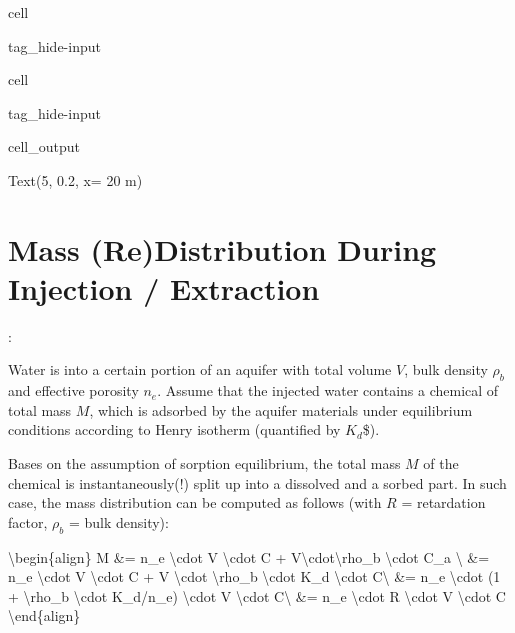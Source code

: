 \documentclass[letterpaper,10pt,english]{jupyterBook}
\begin{document}
\begin{sphinxuseclass}{cell}
\begin{sphinxuseclass}{tag_hide-input}
\end{sphinxuseclass}
\end{sphinxuseclass}
\begin{sphinxuseclass}{cell}
\begin{sphinxuseclass}{tag_hide-input}\begin{sphinxVerbatimOutput}

\begin{sphinxuseclass}{cell_output}
\begin{sphinxVerbatim}[commandchars=\\\{\}]
Text(5, 0.2, \PYGZsq{}\PYGZdl{}x= 20\PYGZdl{} m\PYGZsq{})
\end{sphinxVerbatim}

\noindent{}

\end{sphinxuseclass}\end{sphinxVerbatimOutput}

\end{sphinxuseclass}
\end{sphinxuseclass}

\section{Mass (Re\sphinxhyphen{})Distribution During Injection / Extraction}
\label{\detokenize{content/transport/L10/22_reactive_transport:mass-re-distribution-during-injection-extraction}}
\sphinxAtStartPar
{}:

\sphinxAtStartPar
Water is  into a certain portion of an aquifer with total volume \(V\), bulk density \(\rho_b\) and effective porosity \(n_e\). Assume that the injected water contains a chemical of total mass \(M\), which is adsorbed by the aquifer materials under equilibrium conditions according to Henry isotherm (quantified by \(K_d\)\$).

\sphinxAtStartPar
Bases on the assumption of sorption equilibrium, the total mass \(M\) of the chemical is instantaneously(!) split up into a dissolved and a sorbed part. In such case, the mass distribution can be computed as follows (with \(R\) = retardation factor, \(\rho_b\)
= bulk density):

\sphinxAtStartPar
\textbackslash{}begin\{align\}
M \&= n\_e \textbackslash{}cdot V \textbackslash{}cdot C + V\textbackslash{}cdot\textbackslash{}rho\_b \textbackslash{}cdot C\_a \textbackslash{}
\&= n\_e \textbackslash{}cdot V \textbackslash{}cdot C + V \textbackslash{}cdot \textbackslash{}rho\_b \textbackslash{}cdot K\_d \textbackslash{}cdot C\textbackslash{}
\&= n\_e \textbackslash{}cdot (1 + \textbackslash{}rho\_b \textbackslash{}cdot K\_d/n\_e) \textbackslash{}cdot V \textbackslash{}cdot C\textbackslash{}
\&= n\_e \textbackslash{}cdot R \textbackslash{}cdot V \textbackslash{}cdot C
\textbackslash{}end\{align\}
\end{document}
